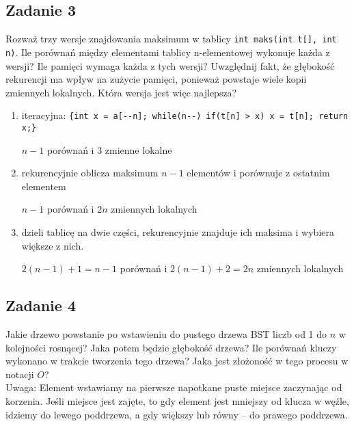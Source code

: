 \documentclass{article}
\begin{document}
\pagebreak
\subsection*{Zadanie 3}
Rozważ trzy wersje znajdowania maksimum w tablicy \verb|int maks(int t[], int n)|.
Ile porównań między elementami tablicy n-elementowej wykonuje każda z wersji? Ile
pamięci wymaga każda z tych wersji? Uwzględnij fakt, że głębokość rekurencji ma wpływ
na zużycie pamięci, ponieważ powstaje wiele kopii zmiennych lokalnych. Która wersja
jest więc najlepsza?
\begin{enumerate}[label=(\alph*)]
    \item iteracyjna: \verb|{int x = a[--n]; while(n--) if(t[n] > x) x = t[n]; return x;}|
          \begin{center}
              $n-1$ porównań i 3 zmienne lokalne
          \end{center}
    \item rekurencyjnie oblicza maksimum $n-1$ elementów i porównuje z ostatnim elementem
          \begin{center}
              $n-1$ porównań i $2n$ zmiennych lokalnych
          \end{center}
    \item dzieli tablicę na dwie części, rekurencyjnie znajduje ich maksima i wybiera większe z nich.
          \begin{center}
              $2(n-1)+1 = n-1$ porównań i $2(n-1) + 2 = 2n$ zmiennych lokalnych
          \end{center}
\end{enumerate}

\subsection*{Zadanie 4}
Jakie drzewo powstanie po wstawieniu do pustego drzewa BST liczb od 1 do $n$ w kolejności rosnącej?
Jaka potem będzie głębokość drzewa? Ile porównań kluczy wykonano w
trakcie tworzenia tego drzewa? Jaka jest złożoność w tego procesu w notacji $O$?
\smallskip \\
Uwaga: Element wstawiamy na pierwsze napotkane puste miejsce zaczynając od korzenia.
Jeśli miejsce jest zajęte, to gdy element jest mniejszy od klucza w węźle, idziemy
do lewego poddrzewa, a gdy większy lub równy -- do prawego poddrzewa.
\end{document}
